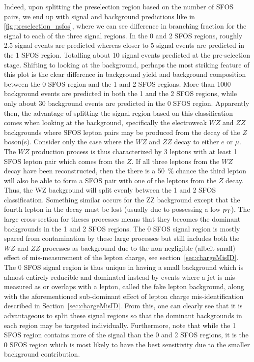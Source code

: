 Indeed, upon splitting the preselection region based on the number of SFOS
pairs, we end up with signal and background predictions like in 
\fig\ref{fig:preselection_nsfos}, where we can see difference
in branching fraction for the signal to each of the three signal regions.
In the 0 and 2 SFOS regions, roughly 2.5 signal events are predicted
whereas closer to 5 signal events are predicted in the 1 SFOS region. 
Totalling about 10 signal events predicted at the pre-selection stage.
Shifting to looking at the background, perhaps the most striking 
feature of this plot is the 
clear difference in background yield and background composition
between the 0 SFOS region and the 1 and 2 SFOS regions.
More than 1000 background events are predicted in both the 1 and
the 2 SFOS regions, while only about 30 background events are
predicted in the 0 SFOS region.
Apparently then, the advantage of splitting the signal region based on this
classification comes when looking at the background, specifically the
electroweak $WZ$ and $ZZ$ backgrounds where SFOS lepton pairs may be
produced from the decay of the $Z$ boson(s). Consider only the case
where the $WZ$ and $ZZ$ decay to either $e$ or $\mu$.  The $WZ$ production
process is thus characterized by 3 leptons with at least 1 SFOS lepton pair
which comes from the $Z$. If all three leptons from the $WZ$ decay have been
reconstructed, then the there is a 50~\% chance the third lepton 
will also be able to form a SFOS pair with one of the leptons from the $Z$ decay.
Thus, the WZ background will split evenly between the 1 and 2 SFOS classification.
Something similar occurs for the ZZ background except that the fourth lepton 
in the decay must be lost (usually due to possessing a low $p_{\mathrm{T}}$).
The large cross-section for theses processes means that
they becomes the dominant backgrounds in the 1 and 2 SFOS regions.  
The 0 SFOS signal region is mostly spared from contamination  by 
these large processes but still
includes both the $WZ$ and $ZZ$ processes as background due to the
non-negligible (albeit small) effect of mis-measurement of the lepton
charge, see section~\ref{sec:chargeMisID}.  The 0 SFOS signal region
is thus unique in having a small background which is almost entirely
reducible and dominated instead by events where a jet is mis-measured
as or overlaps with a lepton, called the fake lepton background, along
with the aforementioned sub-dominant effect of lepton charge 
mis-identification described in Section~\ref{sec:chargeMisID}.  
From this, one can clearly see that it is
advantageous to split these signal regions so that the dominant
backgrounds in each region may be targeted individually.  Furthermore,
note that while the 1 SFOS region contains more of the signal than the
0 and 2 SFOS regions, it is the 0 SFOS region which is most likely to
have the best sensitivity due to the smaller background contribution.


